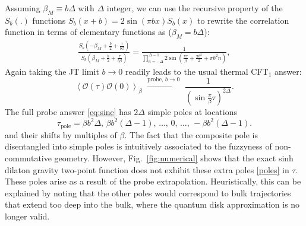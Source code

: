 \documentclass[a4paper,titlepage,12pt]{article}
\numberwithin{equation}{section}
\begin{document}
Assuming $\beta_M\equiv b\Delta$ with $\Delta$ integer, we can use the recursive property of the $S_b(.)$ functions $S_b(x+b)=2\sin(\pi bx)S_b(x)$ to rewrite the correlation function in terms of elementary functions as ($\beta_M = b\Delta$):
 \begin{align}
 \label{eq:sine}
    \frac{S_b(-\beta_M+\frac{b}{2}+\frac{\tau}{b\beta})}{S_b(\beta_M+\frac{b}{2}+\frac{\tau}{b\beta})}=\frac{1}{\prod_{n=-\Delta}^{\Delta-1}2\sin\left(\frac{\pi\tau}{\beta}+\frac{\pi b^2}{2}+\pi b^2n\right) },
\end{align} 
Again taking the JT limit $b\to 0$ readily leads to the usual thermal CFT$_1$ answer:
\begin{equation}\label{eq:classicalcorrelator}
\left\langle \mathcal{O}(\tau) \mathcal{O}(0)\right\rangle_{\beta}\,\,\overset{\text{probe, } b\to 0}{\longrightarrow} \,\, \frac{1}{\left(\sin \frac{\pi}{\beta}\tau\right)^{2\Delta}}.
\end{equation}
The full probe answer \eqref{eq:sine} has $2\Delta$ simple poles at locations 
\begin{equation}\label{poles}
\tau_{\text{pole}} =\beta b^2\Delta, \, \beta b^2(\Delta-1), \, \hdots  , \, 0, \,  \hdots , \, -\beta b^2(\Delta-1).
\end{equation}
and their shifts by multiples of $\beta$. The fact that the composite pole is disentangled into simple poles is intuitively associated to the fuzzyness of non-commutative geometry. However, Fig.~\ref{fig:numerical} shows that the exact sinh dilaton gravity two-point function does not exhibit these extra poles \eqref{poles} in $\tau$. These poles arise as a result of the probe extrapolation. Heuristically, this can be explained by noting that the other poles would correspond to bulk trajectories that extend too deep into the bulk, where the quantum disk approximation is no longer valid.
\end{document}
